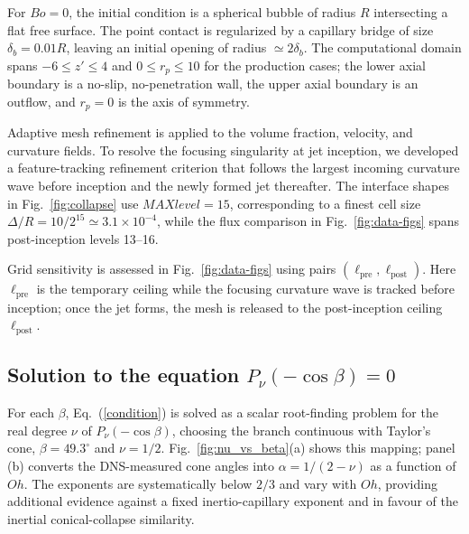 \documentclass[aps,prl,reprint,floatfix]{revtex4-2}
\begin{document}
For $Bo=0$, the initial condition is a spherical bubble of radius $R$ intersecting a flat free surface. The point contact is regularized by a capillary bridge of size $\delta_b=0.01R$, leaving an initial opening of radius $\simeq2\delta_b$. The computational domain spans $-6\le z'\le4$ and $0\le r_p\le10$ for the production cases; the lower axial boundary is a no-slip, no-penetration wall, the upper axial boundary is an outflow, and $r_p=0$ is the axis of symmetry.

Adaptive mesh refinement is applied to the volume fraction, velocity, and curvature fields. To resolve the focusing singularity at jet inception, we developed a feature-tracking refinement criterion that follows the largest incoming curvature wave before inception and the newly formed jet thereafter. The interface shapes in Fig.~\ref{fig:collapse} use $MAXlevel=15$, corresponding to a finest cell size $\Delta/R=10/2^{15}\simeq3.1\times10^{-4}$, while the flux comparison in Fig.~\ref{fig:data-figs} spans post-inception levels 13--16.

Grid sensitivity is assessed in Fig.~\ref{fig:data-figs} using pairs $(\ell_{\mathrm{pre}},\ell_{\mathrm{post}})$. Here $\ell_{\mathrm{pre}}$ is the temporary ceiling while the focusing curvature wave is tracked before inception; once the jet forms, the mesh is released to the post-inception ceiling $\ell_{\mathrm{post}}$.

\subsection*{\texorpdfstring{Solution to the equation $P_\nu(-\cos\beta) = 0$}{Solution to the equation Pnu(-cos beta) = 0}}

For each $\beta$, Eq.~(\ref{condition}) is solved as a scalar root-finding problem for the real degree $\nu$ of $P_\nu(-\cos\beta)$, choosing the branch continuous with Taylor's cone, $\beta=49.3^\circ$ and $\nu=1/2$. Fig.~\ref{fig:nu_vs_beta}(a) shows this mapping; panel (b) converts the DNS-measured cone angles into $\alpha=1/(2-\nu)$ as a function of $Oh$. The exponents are systematically below $2/3$ and vary with $Oh$, providing additional evidence against a fixed inertio-capillary exponent and in favour of the inertial conical-collapse similarity.
\end{document}
